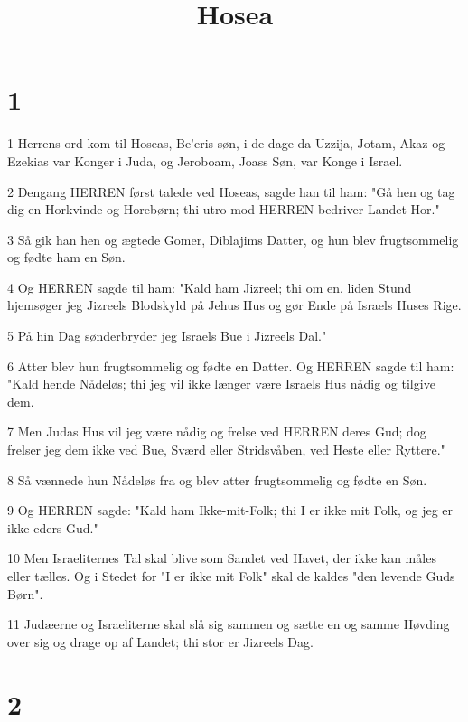

\title{Hosea}


\chapter{1}

\par 1 Herrens ord kom til Hoseas, Be'eris søn, i de dage da Uzzija, Jotam, Akaz og Ezekias var Konger i Juda, og Jeroboam, Joass Søn, var Konge i Israel.
\par 2 Dengang HERREN først talede ved Hoseas, sagde han til ham: "Gå hen og tag dig en Horkvinde og Horebørn; thi utro mod HERREN bedriver Landet Hor."
\par 3 Så gik han hen og ægtede Gomer, Diblajims Datter, og hun blev frugtsommelig og fødte ham en Søn.
\par 4 Og HERREN sagde til ham: "Kald ham Jizreel; thi om en, liden Stund hjemsøger jeg Jizreels Blodskyld på Jehus Hus og gør Ende på Israels Huses Rige.
\par 5 På hin Dag sønderbryder jeg Israels Bue i Jizreels Dal."
\par 6 Atter blev hun frugtsommelig og fødte en Datter. Og HERREN sagde til ham: "Kald hende Nådeløs; thi jeg vil ikke længer være Israels Hus nådig og tilgive dem.
\par 7 Men Judas Hus vil jeg være nådig og frelse ved HERREN deres Gud; dog frelser jeg dem ikke ved Bue, Sværd eller Stridsvåben, ved Heste eller Ryttere."
\par 8 Så vænnede hun Nådeløs fra og blev atter frugtsommelig og fødte en Søn.
\par 9 Og HERREN sagde: "Kald ham Ikke-mit-Folk; thi I er ikke mit Folk, og jeg er ikke eders Gud."
\par 10 Men Israeliternes Tal skal blive som Sandet ved Havet, der ikke kan måles eller tælles. Og i Stedet for "I er ikke mit Folk" skal de kaldes "den levende Guds Børn".
\par 11 Judæerne og Israeliterne skal slå sig sammen og sætte en og samme Høvding over sig og drage op af Landet; thi stor er Jizreels Dag.

\chapter{2}

